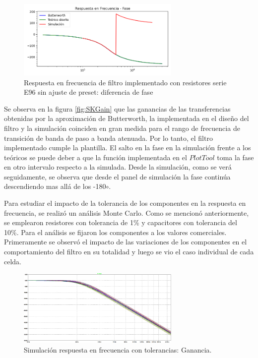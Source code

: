 \begin{figure}[H]
    \centering
    \includegraphics[width= 0.7\textwidth]{../Ejercicio2-DisenoDeCeldas/1CeldaSallenKey/images/SKphase.png}
    \caption{Respuesta en frecuencia de filtro implementado con resistores serie E96 sin ajuste de preset: diferencia de fase}
    \label{fig:SKphase}
\end{figure}

Se observa en la figura \ref{fig:SKGain} que las ganancias de las transferencias obtenidas por la aproximación de Butterworth, la implementada en el diseño del filtro y la simulación coinciden en gran medida para el rango de frecuencia de transición de banda de paso a banda atenuada. Por lo tanto, el filtro implementado cumple la plantilla. El salto en la fase en la simulación frente a los teóricos se puede deber a que la función implementada en el $Plot Tool$ toma la fase en otro intervalo respecto a la simulada. Desde la simulación, como se verá seguidamente, se observa que desde el panel de simulación la fase continúa descendiendo mas allá de los -180$\circ$.

Para estudiar el impacto de la tolerancia de los componentes en la respuesta en frecuencia, se realizó un análisis Monte Carlo. Como se mencionó anteriormente, se emplearon resistores con tolerancia de 1\% y capacitores con tolerancia del 10\%. Para el análisis se fijaron los componentes a los valores comerciales. Primeramente se observó el impacto de las variaciones de los componentes en el comportamiento del filtro en su totalidad y luego se vio el caso individual de cada celda. 

\begin{figure}[H]
    \centering
    \includegraphics[width= 0.7\textwidth]{../Ejercicio2-DisenoDeCeldas/1CeldaSallenKey/images/simuMagNormalizados.png}
    \caption{Simulación respuesta en frecuencia con tolerancias: Ganancia.}
    \label{fig:simugain}
\end{figure}

